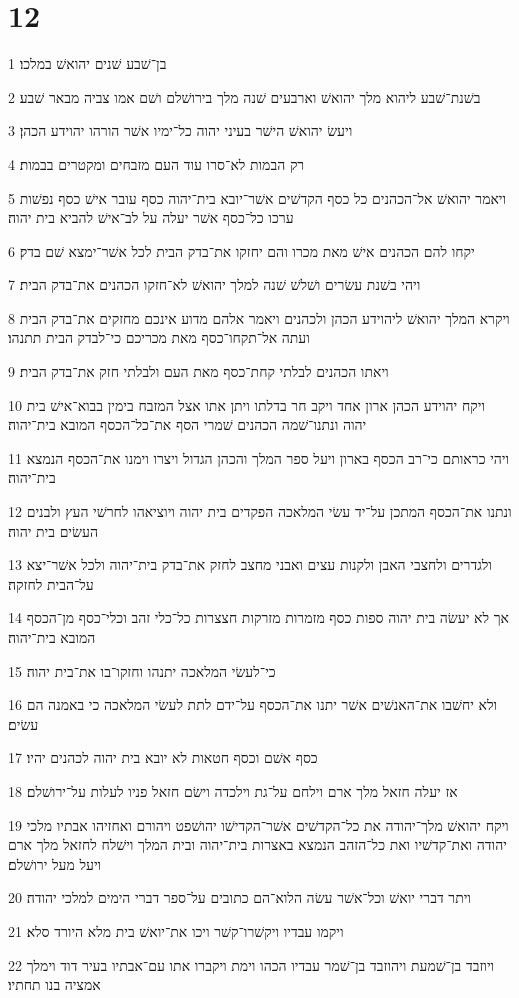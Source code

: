 \chapter{12}

\par 1 בן־שׁבע שׁנים יהואשׁ במלכו׃
\par 2 בשׁנת־שׁבע ליהוא מלך יהואשׁ וארבעים שׁנה מלך בירושׁלם ושׁם אמו צביה מבאר שׁבע׃
\par 3 ויעשׂ יהואשׁ הישׁר בעיני יהוה כל־ימיו אשׁר הורהו יהוידע הכהן׃
\par 4 רק הבמות לא־סרו עוד העם מזבחים ומקטרים בבמות׃
\par 5 ויאמר יהואשׁ אל־הכהנים כל כסף הקדשׁים אשׁר־יובא בית־יהוה כסף עובר אישׁ כסף נפשׁות ערכו כל־כסף אשׁר יעלה על לב־אישׁ להביא בית יהוה׃
\par 6 יקחו להם הכהנים אישׁ מאת מכרו והם יחזקו את־בדק הבית לכל אשׁר־ימצא שׁם בדק׃
\par 7 ויהי בשׁנת עשׂרים ושׁלשׁ שׁנה למלך יהואשׁ לא־חזקו הכהנים את־בדק הבית׃
\par 8 ויקרא המלך יהואשׁ ליהוידע הכהן ולכהנים ויאמר אלהם מדוע אינכם מחזקים את־בדק הבית ועתה אל־תקחו־כסף מאת מכריכם כי־לבדק הבית תתנהו׃
\par 9 ויאתו הכהנים לבלתי קחת־כסף מאת העם ולבלתי חזק את־בדק הבית׃
\par 10 ויקח יהוידע הכהן ארון אחד ויקב חר בדלתו ויתן אתו אצל המזבח בימין בבוא־אישׁ בית יהוה ונתנו־שׁמה הכהנים שׁמרי הסף את־כל־הכסף המובא בית־יהוה׃
\par 11 ויהי כראותם כי־רב הכסף בארון ויעל ספר המלך והכהן הגדול ויצרו וימנו את־הכסף הנמצא בית־יהוה׃
\par 12 ונתנו את־הכסף המתכן על־יד עשׂי המלאכה הפקדים בית יהוה ויוציאהו לחרשׁי העץ ולבנים העשׂים בית יהוה׃
\par 13 ולגדרים ולחצבי האבן ולקנות עצים ואבני מחצב לחזק את־בדק בית־יהוה ולכל אשׁר־יצא על־הבית לחזקה׃
\par 14 אך לא יעשׂה בית יהוה ספות כסף מזמרות מזרקות חצצרות כל־כלי זהב וכלי־כסף מן־הכסף המובא בית־יהוה׃
\par 15 כי־לעשׂי המלאכה יתנהו וחזקו־בו את־בית יהוה׃
\par 16 ולא יחשׁבו את־האנשׁים אשׁר יתנו את־הכסף על־ידם לתת לעשׂי המלאכה כי באמנה הם עשׂים׃
\par 17 כסף אשׁם וכסף חטאות לא יובא בית יהוה לכהנים יהיו׃
\par 18 אז יעלה חזאל מלך ארם וילחם על־גת וילכדה וישׂם חזאל פניו לעלות על־ירושׁלם׃
\par 19 ויקח יהואשׁ מלך־יהודה את כל־הקדשׁים אשׁר־הקדישׁו יהושׁפט ויהורם ואחזיהו אבתיו מלכי יהודה ואת־קדשׁיו ואת כל־הזהב הנמצא באצרות בית־יהוה ובית המלך וישׁלח לחזאל מלך ארם ויעל מעל ירושׁלם׃
\par 20 ויתר דברי יואשׁ וכל־אשׁר עשׂה הלוא־הם כתובים על־ספר דברי הימים למלכי יהודה׃
\par 21 ויקמו עבדיו ויקשׁרו־קשׁר ויכו את־יואשׁ בית מלא היורד סלא׃
\par 22 ויוזבד בן־שׁמעת ויהוזבד בן־שׁמר עבדיו הכהו וימת ויקברו אתו עם־אבתיו בעיר דוד וימלך אמציה בנו תחתיו׃

